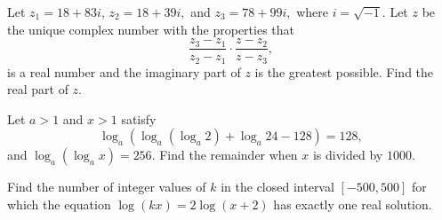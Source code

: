 \documentclass[11pt]{article}
\theoremstyle{definition}
\begin{document}
\begin{question}[name={2017 AIME I, \href{https://artofproblemsolving.com/community/c4p7812824}{Problem 10}}]
	Let $z_1 = 18 + 83i$, $z_2 = 18 + 39i, $ and $z_3 = 78 + 99i,$ where $i = \sqrt{-1}$. Let $z$ be the unique complex number with the properties that $$\frac{z_3 - z_1}{z_2 - z_1} \cdot \frac{z - z_2}{z - z_3},$$ is a real number and the imaginary part of $z$ is the greatest possible. Find the real part of $z$.	
	
\end{question}


%	












\begin{question}[name={2017 AIME I, \href{https://artofproblemsolving.com/community/c4p7812869}{Problem 14}}]
	Let $a > 1$ and $x > 1$ satisfy $$\log_a(\log_a(\log_a 2) + \log_a 24 - 128) = 128,$$ and $\log_a(\log_a x) = 256$. Find the remainder when $x$ is divided by $1000$.	
\end{question}


%	

















\begin{question}[name={2017 AIME II, \href{https://artofproblemsolving.com/community/c4p7910326}{Problem 7}}]
	Find the number of integer values of $k$ in the closed interval $[-500,500]$ for which the equation $\log(kx)=2\log(x+2)$ has exactly one real solution.	
\end{question}


%	
\end{document}
